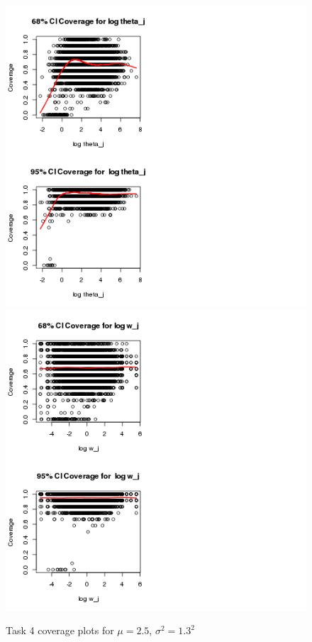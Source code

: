 \documentclass[paper=a4, fontsize=11pt]{scrartcl}
\begin{document}
\begin{figure}[h!]
  \caption{Task 4 coverage plots for $\mu = 2.5$, $\sigma^2 = 1.3^2$}
  \centering
	\includegraphics[scale=1, trim = 80 0 150 0]{keskici_wxiao_ps2_task4_plot3.png}
		\includegraphics[scale=1, trim = 100 0 300 0]{keskici_wxiao_ps2_task4_plot4.png}
\end{figure}
\end{document}
